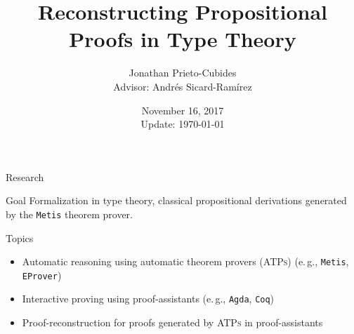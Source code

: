 \documentclass[10pt, xetex, hyperref={pdfpagelabels=false}]{beamer}
\title[Reconstructing Propositional Proofs in Type Theory]
  {\textbf{Reconstructing Propositional Proofs in Type Theory}}
\date{November 16, 2017\\
Update: \today}
\author[Jonathan Prieto-Cubides]{Jonathan Prieto-Cubides\\
Advisor: Andr\'es Sicard-Ram\'irez
}
\institute{
Master in Applied Mathematics\\
Universidad EAFIT\\
Medell\'in, Colombia}
\newcommand{\abbre}[1]{\textsc{#1}\xspace}
\newcommand{\ATPs}{\abbre{ATPs}}
\newcommand{\name}[1]{\texttt{#1}\xspace}
\newcommand{\prg}[1]{\texttt{#1}\xspace}
\newcommand{\Agda}{\prg{Agda}}
\newcommand{\Metis}{\prg{Metis}}
\newcommand{\abbrev}[1]{#1} %
\newcommand{\eg}{\abbrev{e.\,g.}}
\begin{document}
\setcounter{page}{1}


\begin{frame}[plain]
\titlepage
\end{frame}


\begin{frame}{Research}

\begin{block}{Goal}
Formalization in type theory, classical propositional
derivations generated by the \Metis theorem prover.
\end{block}
\pause
\begin{block}{Topics}
\begin{itemize}
\item Automatic reasoning using automatic theorem provers (\ATPs) (\eg, \Metis, \name{EProver})
\item Interactive proving using proof-assistants (\eg, \Agda, \name{Coq})
\item Proof-reconstruction for proofs generated by \ATPs in proof-assistants
\end{itemize}
\end{block}
\end{frame}


\end{document}
